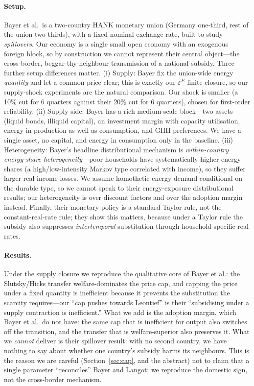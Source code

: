 \documentclass[11pt,a4paper]{article}
\begin{document}
\paragraph{Setup.} Bayer et al.\ is a two-country HANK monetary union (Germany
one-third, rest of the union two-thirds), with a fixed nominal exchange rate,
built to study \emph{spillovers}. Our economy is a single small open economy
with an exogenous foreign block, so by construction we cannot represent their
central object---the cross-border, beggar-thy-neighbour transmission of a
national subsidy. Three further setup differences matter. (i) Supply: Bayer
fix the union-wide energy \emph{quantity} and let a common price clear; this is
exactly our $\varepsilon^E$-finite closure, so our supply-shock experiments are
the natural comparison. Our shock is smaller (a 10\% cut for 6 quarters against
their 20\% cut for 6 quarters), chosen for first-order reliability. (ii) Supply
side: Bayer has a rich medium-scale block---two assets (liquid bonds, illiquid
capital), an investment margin with capacity utilisation, energy in production
as well as consumption, and GHH preferences. We have a single asset, no
capital, and energy in consumption only in the baseline. (iii) Heterogeneity:
Bayer's headline distributional mechanism is \emph{within-country
energy-share heterogeneity}---poor households have systematically higher energy
shares (a high/low-intensity Markov type correlated with income), so they
suffer larger real-income losses. We assume homothetic energy demand
conditional on the durable type, so we cannot speak to their energy-exposure
distributional results; our heterogeneity is over discount factors and over the
adoption margin instead. Finally, their monetary policy is a standard Taylor
rule, not the constant-real-rate rule; they show this matters, because under a
Taylor rule the subsidy also suppresses \emph{intertemporal} substitution
through household-specific real rates.

\paragraph{Results.} Under the supply closure we reproduce the qualitative
core of Bayer et al.: the Slutsky/Hicks transfer welfare-dominates the price
cap, and capping the price under a fixed
quantity is inefficient because it prevents the substitution the scarcity
requires---our ``cap pushes towards Leontief'' is their ``subsidising under a
supply contraction is inefficient.'' What we add is the adoption margin, which
Bayer et al.\ do not have: the same cap that is inefficient for output also
switches off the transition, and the transfer that is welfare-superior also
preserves it. What we \emph{cannot} deliver is their spillover result: with no
second country, we have nothing to say about whether one country's subsidy
harms its neighbours. This is the reason we are careful (Section~\ref{sec:cap}, and the
abstract) not to claim that a single parameter ``reconciles'' Bayer and Langot;
we reproduce the domestic sign, not the cross-border mechanism.
\end{document}
